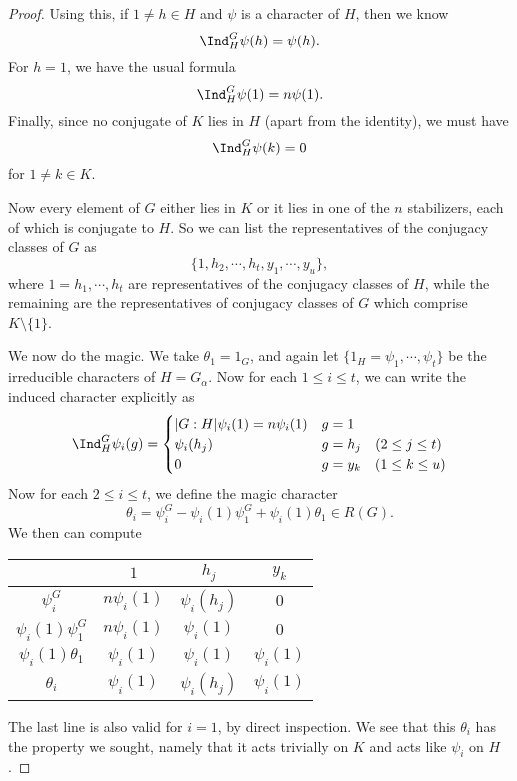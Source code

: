 \documentclass[a4paper]{article}
\begin{document}
\begin{proof}
  Using this, if $1 \not= h \in H$ and $\psi$ is a character of $H$, then we know
  \[
    \Ind_H^G \psi(h) = \psi (h).
  \]
  For $h = 1$, we have the usual formula
  \[
    \Ind_H^G \psi(1) = n \psi (1).
  \]
  Finally, since no conjugate of $K$ lies in $H$ (apart from the identity), we must have
  \[
    \Ind_H^G \psi(k) = 0
  \]
  for $1 \not= k \in K$.

  Now every element of $G$ either lies in $K$ or it lies in one of the $n$ stabilizers, each of which is conjugate to $H$. So we can list the representatives of the conjugacy classes of $G$ as
  \[
    \{1, h_2, \cdots, h_t, y_1, \cdots, y_u\},
  \]
  where $1 = h_1, \cdots, h_t$ are representatives of the conjugacy classes of $H$, while the remaining are the representatives of conjugacy classes of $G$ which comprise $K \setminus \{1\}$.

  We now do the magic. We take $\theta_1 = 1_G$, and again let $\{1_H = \psi_1, \cdots, \psi_t\}$ be the irreducible characters of $H = G_\alpha$. Now for each $1 \leq i \leq t$, we can write the induced character explicitly as
  \[
    \Ind_H^G \psi_i(g) =
    \begin{cases}
      |G:H| \psi_i(1) = n \psi_i (1) & g = 1\\
      \psi_i(h_j) & g = h_j\quad (2 \leq j \leq t)\\
      0 & g = y_k\quad (1 \leq k \leq u)
    \end{cases}
  \]
  Now for each $2 \leq i \leq t$, we define the magic character
  \[
    \theta_i = \psi_i^G - \psi_i(1) \psi_1^G + \psi_i(1) \theta_1 \in R(G).
  \]
  We then can compute
  \begin{center}
    \begin{tabular}{cccc}
      \toprule
      & $1$ & $h_j$ & $y_k$\\
      \midrule
      $\psi_i^G$ & $n \psi_i(1)$ & $\psi_i(h_j)$ & $0$\\
      $\psi_i(1) \psi_1^G$ & $n \psi_i(1)$ & $\psi_i(1)$ & $0$\\
      $\psi_i(1) \theta_1$ & $\psi_i(1)$ & $\psi_i(1)$ & $\psi_i(1)$\\
      $\theta_i$ & $\psi_i(1)$ & $\psi_i(h_j)$ & $\psi_i(1)$\\
      \bottomrule
    \end{tabular}
  \end{center}
  The last line is also valid for $i = 1$, by direct inspection. We see that this $\theta_i$ has the property we sought, namely that it acts trivially on $K$ and acts like $\psi_i$ on $H$.


\end{proof}
\end{document}
